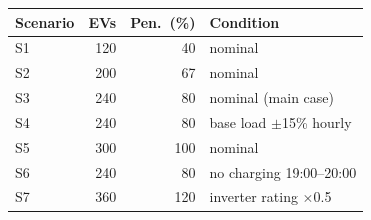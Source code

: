 \begin{tabular}{@{}lrrl@{}}
\toprule
Scenario & EVs & Pen.\ (\%) & Condition \\
\midrule
S1 & 120 & 40 & nominal \\
S2 & 200 & 67 & nominal \\
S3 & 240 & 80 & nominal (main case) \\
S4 & 240 & 80 & base load $\pm$15\% hourly \\
S5 & 300 & 100 & nominal \\
S6 & 240 & 80 & no charging 19:00--20:00 \\
S7 & 360 & 120 & inverter rating $\times$0.5 \\
\bottomrule
\end{tabular}

